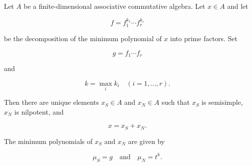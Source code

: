 Let $A$ be a finite-dimensional associative commutative algebra. Let $x \in A$ and let

$$f = f_1^{k_1} \cdots f_r^{k_r}$$

be the decomposition of the minimum polynomial of $x$ into prime factors. Set

$$g = f_1 \cdots f_r$$

and

$$k = \max_i k_i \quad (i = 1, \ldots, r).$$

Then there are unique elements $x_S \in A$ and $x_N \in A$ such that $x_S$ is semisimple, $x_N$ is nilpotent, and

$$x = x_S + x_N.$$

The minimum polynomials of $x_S$ and $x_N$ are given by

$$\mu_S = g \quad \text{and} \quad \mu_N = t^k.$$
